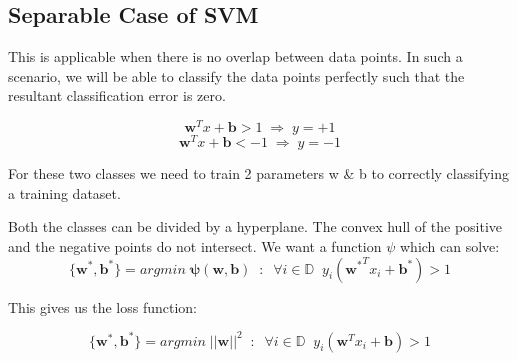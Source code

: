 \documentclass[12pt]{article}
\begin{document}


\subsection{Separable Case of SVM}
This is applicable when there is no overlap between data points. In such a scenario, we will be able to classify the data points perfectly such that the resultant classification error is zero.   



\vspace{4pt}


$$\mathbf{w}^Tx + \mathbf{b} > 1 \; \Rightarrow \; y=+1$$
$$\mathbf{w}^Tx + \mathbf{b} < -1 \; \Rightarrow \; y=-1$$

\noindent For these two classes we need to train 2 parameters w \& b to correctly classifying a training dataset.


\vspace{4pt}


\noindent Both the classes can be divided by a hyperplane. The convex hull of the positive and the negative points do not intersect. We want a function $\psi$ which can solve:
$$\{\mathbf{w}^*,\mathbf{b}^*\}=argmin \; \mathbf{\psi(w,b)} \;\; : \;\; \forall i \in \mathbb{D}\;\; y_i({\mathbf{w}^*}^Tx_i+\mathbf{b}^*) > 1$$


\vspace{5pt}


\noindent This gives us the loss function:

  $$\{\mathbf{w}^*,\mathbf{b}^*\}=argmin \; ||\mathbf{w}||^2\;\; : \;\;\forall i \in \mathbb{D}\;\; y_i(\mathbf{w}^Tx_i+\mathbf{b}) > 1$$
\end{document}
